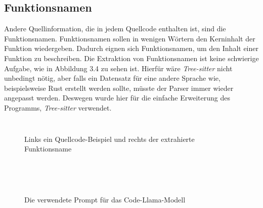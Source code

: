 \documentclass[12pt,letterpaper,ngerman]{article}
\begin{document}
\subsection{Funktionsnamen}
Andere Quellinformation, die in jedem Quellcode enthalten ist,
sind die Funktionsnamen. Funktionsnamen sollen in wenigen Wörtern 
den Kerninhalt der Funktion wiedergeben. Dadurch eignen sich 
Funktionsnamen, um den Inhalt einer Funktion zu beschreiben. 
Die Extraktion von Funktionsnamen ist keine schwierige Aufgabe, 
wie in Abbildung 3.4 zu sehen ist.
Hierfür wäre \textit{Tree-sitter} nicht unbedingt nötig, 
aber falls ein 
Datensatz für eine andere Sprache wie, beispielsweise Rust
erstellt werden sollte,
müsste der Parser immer wieder angepasst werden.
Deswegen wurde hier für die einfache Erweiterung des Programms,
\textit{Tree-sitter} verwendet. 
%
\begin{figure}
  \begin{center}
    \begin{minipage}[c]{6cm}
        \centering
        \inputminted[fontsize=\scriptsize]{c}{comments.c}
    \end{minipage}
    \hspace{0.1cm}
    \begin{minipage}[c]{6cm}
        \centering
        \inputminted[fontsize=\scriptsize]{json}{names.json}
    \end{minipage}
  \end{center}
  \caption{Links ein Quellcode-Beispiel und rechts der extrahierte Funktionsname}
\end{figure}

\hfill\\
\pagebreak
\hfill\\

\begin{figure}
  \begin{center}
    \begin{minipage}[c]{6cm}
        \centering
        \inputminted[fontsize=\footnotesize]{python}{prompt.py}
    \end{minipage}
  \end{center}
  \caption{Die verwendete Prompt für das Code-Llama-Modell }
\end{figure}
\end{document}
